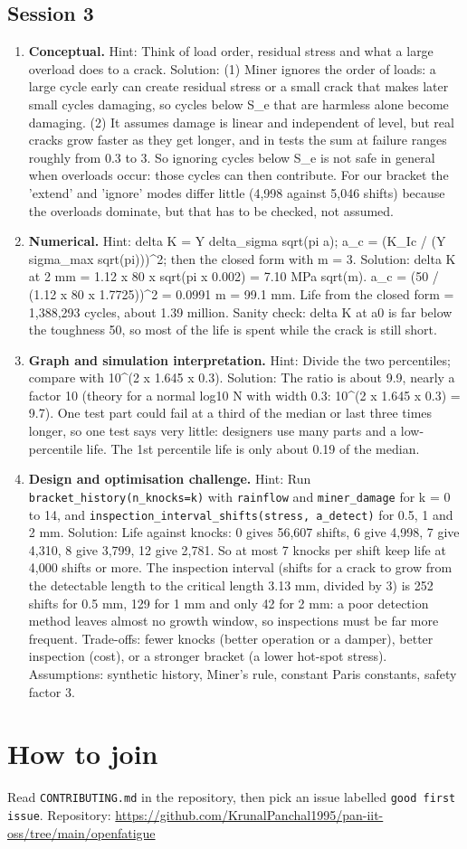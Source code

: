 \documentclass[11pt,a4paper]{article}
\begin{document}
\subsection*{Session 3}
\begin{enumerate}[nosep]
\item \textbf{Conceptual.} Hint: Think of load order, residual stress and what a large overload does to a crack. Solution: (1) Miner ignores the order of loads: a large cycle early can create residual stress or a small crack that makes later small cycles damaging, so cycles below S\_e that are harmless alone become damaging. (2) It assumes damage is linear and independent of level, but real cracks grow faster as they get longer, and in tests the sum at failure ranges roughly from 0.3 to 3. So ignoring cycles below S\_e is not safe in general when overloads occur: those cycles can then contribute. For our bracket the 'extend' and 'ignore' modes differ little (4,998 against 5,046 shifts) because the overloads dominate, but that has to be checked, not assumed.
\item \textbf{Numerical.} Hint: delta K = Y delta\_sigma sqrt(pi a); a\_c = (K\_Ic / (Y sigma\_max sqrt(pi)))\textasciicircum{}2; then the closed form with m = 3. Solution: delta K at 2 mm = 1.12 x 80 x sqrt(pi x 0.002) = 7.10 MPa sqrt(m). a\_c = (50 / (1.12 x 80 x 1.7725))\textasciicircum{}2 = 0.0991 m = 99.1 mm. Life from the closed form = 1,388,293 cycles, about 1.39 million. Sanity check: delta K at a0 is far below the toughness 50, so most of the life is spent while the crack is still short.
\item \textbf{Graph and simulation interpretation.} Hint: Divide the two percentiles; compare with 10\textasciicircum{}(2 x 1.645 x 0.3). Solution: The ratio is about 9.9, nearly a factor 10 (theory for a normal log10 N with width 0.3: 10\textasciicircum{}(2 x 1.645 x 0.3) = 9.7). One test part could fail at a third of the median or last three times longer, so one test says very little: designers use many parts and a low-percentile life. The 1st percentile life is only about 0.19 of the median.
\item \textbf{Design and optimisation challenge.} Hint: Run \texttt{bracket\_history(n\_knocks=k)} with \texttt{rainflow} and \texttt{miner\_damage} for k = 0 to 14, and \texttt{inspection\_interval\_shifts(stress, a\_detect)} for 0.5, 1 and 2 mm. Solution: Life against knocks: 0 gives 56,607 shifts, 6 give 4,998, 7 give 4,310, 8 give 3,799, 12 give 2,781. So at most 7 knocks per shift keep life at 4,000 shifts or more. The inspection interval (shifts for a crack to grow from the detectable length to the critical length 3.13 mm, divided by 3) is 252 shifts for 0.5 mm, 129 for 1 mm and only 42 for 2 mm: a poor detection method leaves almost no growth window, so inspections must be far more frequent. Trade-offs: fewer knocks (better operation or a damper), better inspection (cost), or a stronger bracket (a lower hot-spot stress). Assumptions: synthetic history, Miner's rule, constant Paris constants, safety factor 3.
\end{enumerate}

\section{How to join}
Read \texttt{CONTRIBUTING.md} in the repository, then pick an issue labelled \texttt{good first issue}. Repository: \url{https://github.com/KrunalPanchal1995/pan-iit-oss/tree/main/openfatigue}
\end{document}
